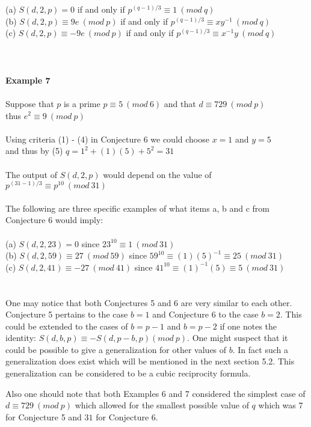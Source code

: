\documentclass[final,letterpaper,oneside,10pt]{article}
\begin{document}
\\
\\
(a) $S(d,2,p) = 0$ if and only if $p^{(q-1)/3} \equiv 1~(mod~q)$
\\
(b) $S(d,2,p) \equiv 9e~(mod~p)$  if and only if $p^{(q-1)/3} \equiv xy^{-1}~(mod~q)$
\\
(c) $S(d,2,p) \equiv -9e~(mod~p)$  if and only if $p^{(q-1)/3} \equiv x^{-1}y~(mod~q)$
\\
\\
\\
\\
\textbf{Example 7}
\\
\\
Suppose that $p$ is a prime $p \equiv 5~(mod~6)$ and that $d \equiv 729~(mod~p)$ 
\\
thus $e^2 \equiv 9~(mod~p)$
\\
\\
Using criteria (1) - (4) in Conjecture 6 we could choose $x=1$ and $y=5$
\\
and thus by (5) $q = 1^2 + (1)(5) + 5^2 = 31$
\\
\\
The output of $S(d,2,p)$ would depend on the value of $p^{(31-1)/3} \equiv p^{10}~(mod~31)$
\\
\\
The following are three specific examples of what items a, b and c from Conjecture 6 would imply:
\\
\\
(a) $S(d,2,23) = 0$ since $23^{10} \equiv  1~(mod~31)$
\\
(b) $S(d,2,59) \equiv 27~(mod~59)$ since $59^{10} \equiv (1)(5)^{-1} \equiv 25~(mod~31)$
\\
(c) $S(d,2,41) \equiv -27~(mod~41)$ since $41^{10} \equiv (1)^{-1}(5) \equiv 5~(mod~31)$
\\
\\
\\
One may notice that both Conjectures 5 and 6 are very similar to each other.  Conjecture 5 pertains to the case $b=1$ and Conjecture 6 to the 
case $b=2$.  This could be extended to the cases of $b=p-1$ and $b=p-2$ if one notes the identity: $S(d,b,p) \equiv -S(d,p-b,p)(mod~p)$.
One might suspect that it could be possible to give a generalization for other values of $b$.  In fact such a generalization does exist 
which will be mentioned in the next section 5.2.  This generalization can be considered to be a cubic reciprocity formula.

Also one should note that both Examples 6 and 7 considered the simplest case of $d \equiv 729~(mod~p)$ which allowed for the smallest possible 
value of $q$ which was $7$ for Conjecture 5 and $31$ for Conjecture 6.
\\
\end{document}
